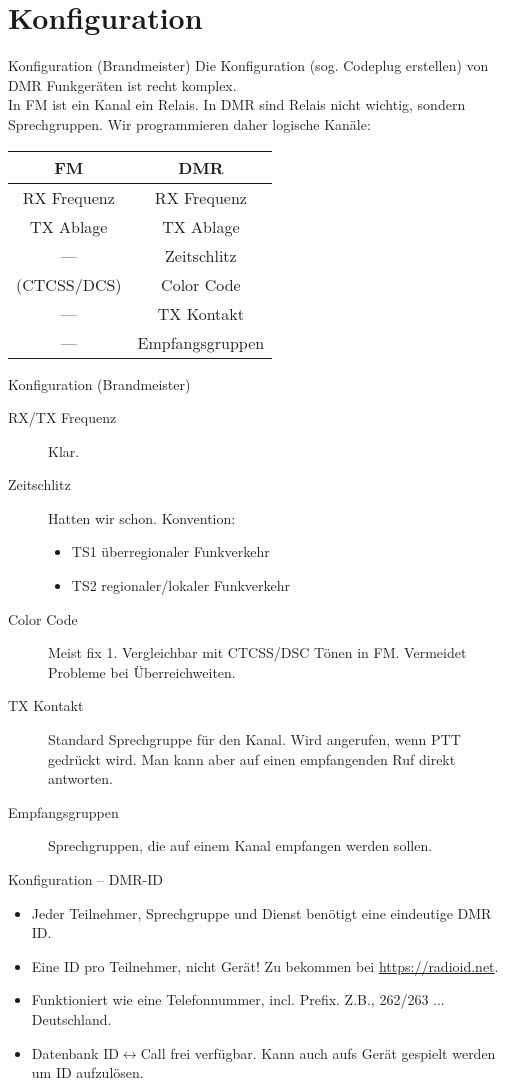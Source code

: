 \documentclass[aspectratio=169]{beamer}
\begin{document}
\section{Konfiguration}
\begin{frame}{Konfiguration (Brandmeister)}
Die Konfiguration (sog. Codeplug erstellen) von DMR Funkgeräten ist recht komplex. \\[0.5cm]

\pause In FM ist ein Kanal ein Relais. In DMR sind Relais nicht wichtig, sondern Sprechgruppen. Wir programmieren daher logische Kanäle:
\begin{center}
\begin{tabular}{|c|c|} \hline
FM & DMR \\ \hline \hline
RX Frequenz & RX Frequenz \\
TX Ablage & TX Ablage \\
 --- & Zeitschlitz \\
(CTCSS/DCS) & Color Code \\
--- & TX Kontakt \\
--- & Empfangsgruppen \\\hline
\end{tabular}
\end{center}
\end{frame}

\begin{frame}{Konfiguration (Brandmeister)}
\begin{description}
 \item[RX/TX Frequenz] Klar.
 \item[Zeitschlitz] Hatten wir schon. Konvention: 
 \begin{itemize}
  \item TS1 überregionaler Funkverkehr
  \item TS2 regionaler/lokaler Funkverkehr
 \end{itemize}
 \item[Color Code] Meist fix 1. Vergleichbar mit CTCSS/DSC Tönen in FM. Vermeidet Probleme bei Überreichweiten.
 \item[TX Kontakt] Standard Sprechgruppe für den Kanal. Wird angerufen, wenn PTT gedrückt wird. Man kann aber auf einen empfangenden Ruf direkt antworten. 
 \item[Empfangsgruppen] Sprechgruppen, die auf einem Kanal empfangen werden sollen.
\end{description}
\end{frame}

\begin{frame}{Konfiguration -- DMR-ID}
 \begin{itemize}
  \item Jeder Teilnehmer, Sprechgruppe und Dienst benötigt eine eindeutige DMR ID. 
  \item Eine ID pro Teilnehmer, nicht Gerät! Zu bekommen bei \url{https://radioid.net}.
  \item Funktioniert wie eine Telefonnummer, incl. Prefix. Z.B., 262/263 ... Deutschland.
  \item Datenbank ID$\leftrightarrow$Call frei verfügbar. Kann auch aufs Gerät gespielt werden um ID aufzulösen.
 \end{itemize}
\end{frame}
\end{document}
